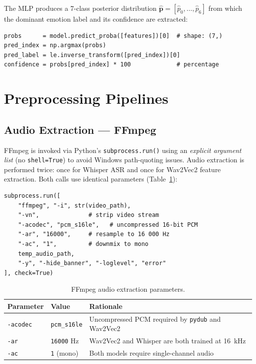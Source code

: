 \documentclass[12pt,a4paper]{article}
\begin{document}
The MLP produces a 7-class posterior distribution
$\hat{\mathbf{p}} = [\hat{p}_0, \ldots, \hat{p}_6]$ from which the
dominant emotion label and its confidence are extracted:

\begin{lstlisting}[caption={MLP inference.}]
probs      = model.predict_proba([features])[0]  # shape: (7,)
pred_index = np.argmax(probs)
pred_label = le.inverse_transform([pred_index])[0]
confidence = probs[pred_index] * 100             # percentage
\end{lstlisting}

\section{Preprocessing Pipelines}
\label{sec:preprocessing}

\subsection{Audio Extraction — FFmpeg}

FFmpeg is invoked via Python's \texttt{subprocess.run()} using an
\textit{explicit argument list} (no \texttt{shell=True}) to avoid
Windows path-quoting issues. Audio extraction is performed twice: once for
Whisper ASR and once for Wav2Vec2 feature extraction. Both calls use
identical parameters (Table~\ref{tab:ffmpeg}):

\begin{lstlisting}[caption={FFmpeg audio extraction command.}]
subprocess.run([
    "ffmpeg", "-i", str(video_path),
    "-vn",              # strip video stream
    "-acodec", "pcm_s16le",   # uncompressed 16-bit PCM
    "-ar", "16000",     # resample to 16 000 Hz
    "-ac", "1",         # downmix to mono
    temp_audio_path,
    "-y", "-hide_banner", "-loglevel", "error"
], check=True)
\end{lstlisting}

\begin{table}[H]
\centering
\caption{FFmpeg audio extraction parameters.}
\label{tab:ffmpeg}
\begin{tabular}{lll}
\toprule
\textbf{Parameter} & \textbf{Value} & \textbf{Rationale} \\
\midrule
\texttt{-acodec} & \texttt{pcm\_s16le} & Uncompressed PCM required by \texttt{pydub} and Wav2Vec2 \\
\texttt{-ar} & \texttt{16000} Hz & Wav2Vec2 and Whisper are both trained at 16~kHz \\
\texttt{-ac} & \texttt{1} (mono) & Both models require single-channel audio \\
\bottomrule
\end{tabular}
\end{table}
\end{document}
